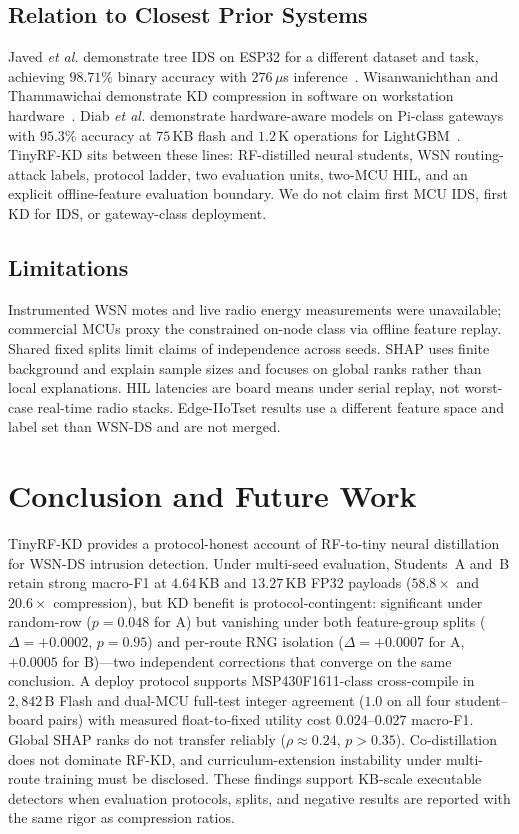 \documentclass[journal]{IEEEtran}
\newcommand{\method}{TinyRF-KD}
\begin{document}
\subsection{Relation to Closest Prior Systems}
Javed \emph{et al.} demonstrate tree IDS on ESP32 for a different dataset and task, achieving $98.71\%$ binary accuracy with $276$\,$\mu$s inference~\cite{javed2024thermostat}.
Wisanwanichthan and Thammawichai demonstrate KD compression in software on workstation hardware~\cite{wisanwanichthan2025kd}.
Diab \emph{et al.} demonstrate hardware-aware models on Pi-class gateways with $95.3\%$ accuracy at $75$\,KB flash and $1.2$\,K operations for LightGBM~\cite{diab2025hardware}.
\method{} sits between these lines: RF-distilled neural students, WSN routing-attack labels, protocol ladder, two evaluation units, two-MCU HIL, and an explicit offline-feature evaluation boundary.
We do not claim first MCU IDS, first KD for IDS, or gateway-class deployment.

\subsection{Limitations}
Instrumented WSN motes and live radio energy measurements were unavailable; commercial MCUs proxy the constrained on-node class via offline feature replay.
Shared fixed splits limit claims of independence across seeds.
SHAP uses finite background and explain sample sizes and focuses on global ranks rather than local explanations.
HIL latencies are board means under serial replay, not worst-case real-time radio stacks.
Edge-IIoTset results use a different feature space and label set than WSN-DS and are not merged.

\section{Conclusion and Future Work}
\label{sec:conclusion}
\method{} provides a protocol-honest account of RF-to-tiny neural distillation for WSN-DS intrusion detection.
Under multi-seed evaluation, Students~A and~B retain strong macro-F1 at $4.64$\,KB and $13.27$\,KB FP32 payloads ($58.8\times$ and $20.6\times$ compression), but KD benefit is protocol-contingent: significant under random-row ($p = 0.048$ for A) but vanishing under both feature-group splits ($\Delta = +0.0002$, $p = 0.95$) and per-route RNG isolation ($\Delta = +0.0007$ for A, $+0.0005$ for B)---two independent corrections that converge on the same conclusion.
A deploy protocol supports MSP430F1611-class cross-compile in $2{,}842$\,B Flash and dual-MCU full-test integer agreement ($1.0$ on all four student--board pairs) with measured float-to-fixed utility cost $0.024$--$0.027$ macro-F1.
Global SHAP ranks do not transfer reliably ($\rho \approx 0.24$, $p > 0.35$).
Co-distillation does not dominate RF-KD, and curriculum-extension instability under multi-route training must be disclosed.
These findings support KB-scale executable detectors when evaluation protocols, splits, and negative results are reported with the same rigor as compression ratios.
\end{document}
